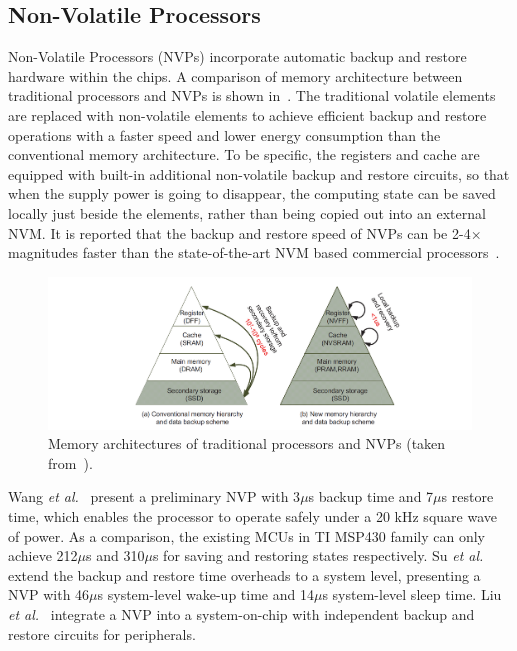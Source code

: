 \subsection{Non-Volatile Processors}

Non-Volatile Processors (NVPs) incorporate automatic backup and restore hardware within the chips. A comparison of memory architecture between traditional processors and NVPs is shown in~. The traditional volatile elements are replaced with non-volatile elements to achieve efficient backup and restore operations with a faster speed and lower energy consumption than the conventional memory architecture. To be specific, the registers and cache are equipped with built-in additional non-volatile backup and restore circuits, so that when the supply power is going to disappear, the computing state can be saved locally just beside the elements, rather than being copied out into an external NVM. It is reported that the backup and restore speed of NVPs can be 2-4$\times$ magnitudes faster than the state-of-the-art NVM based commercial processors~\cite{liu2015ambient}. 

\begin{figure}
    \centering
    \includegraphics[width=\columnwidth]{ch2_review/figures/nvp}
    \caption{Memory architectures of traditional processors and NVPs (taken from~\cite{liu2015ambient}).}
    \label{Figure:nvp}
\end{figure}

Wang \textit{et al.}~\cite{wang20123us} present a preliminary NVP with 3$\mu$s backup time and 7$\mu$s restore time, which enables the processor to operate safely under a 20 kHz square wave of power. As a comparison, the existing MCUs in TI MSP430 family can only achieve 212$\mu$s and 310$\mu$s for saving and restoring states respectively. Su \textit{et al.}~\cite{su2017ferroelectric} extend the backup and restore time overheads to a system level, presenting a NVP with 46$\mu$s system-level wake-up time and 14$\mu$s system-level sleep time. Liu \textit{et al.}~\cite{liu2019130} integrate a NVP into a system-on-chip with independent backup and restore circuits for peripherals. 

